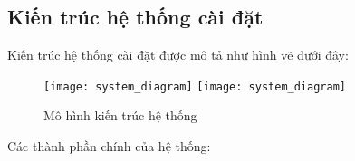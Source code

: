 \subsection{Kiến trúc hệ thống cài đặt}

Kiến trúc hệ thống cài đặt được mô tả như hình vẽ dưới đây:\\

\begin{figure}[H]
  \begin{center}
    \ifpdf
      \texttt{[image: system\_diagram]}
    \else
      \texttt{[image: system\_diagram]}
    \fi
    \caption{Mô hình kiến trúc hệ thống}
    \label{SystemDiagram}
  \end{center}
\end{figure}

Các thành phần chính của hệ thống:

